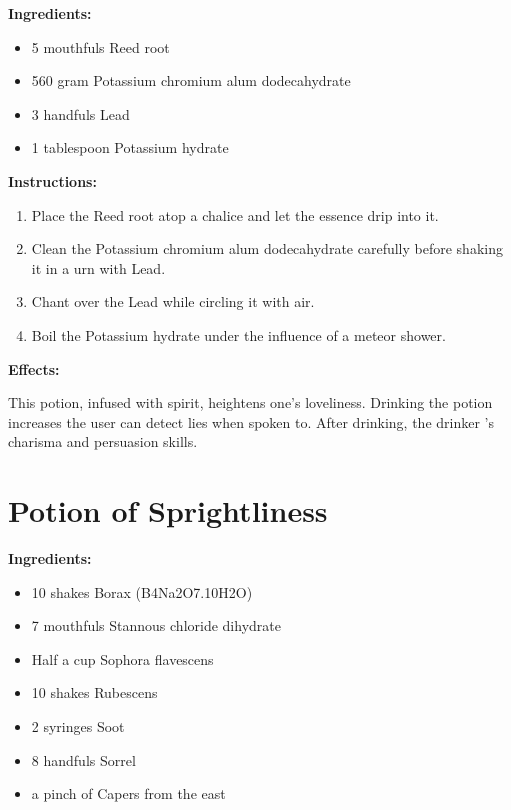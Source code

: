 \documentclass{article}
\begin{document}
\textbf{Ingredients:}

\begin{itemize}
  \item 5 mouthfuls Reed root
  \item 560 gram Potassium chromium alum dodecahydrate
  \item 3 handfuls Lead
  \item 1 tablespoon Potassium hydrate
\end{itemize}

\textbf{Instructions:}

\begin{enumerate}
  \item Place the Reed root atop a chalice and let the essence drip into it.
  \item Clean the Potassium chromium alum dodecahydrate carefully before shaking it in a urn with Lead.
  \item Chant over the Lead while circling it with air.
  \item Boil the Potassium hydrate under the influence of a meteor shower.
\end{enumerate}

\textbf{Effects:}

This potion, infused with spirit, heightens one's loveliness. Drinking the potion increases the user can detect lies when spoken to. After drinking, the drinker 's charisma and persuasion skills.

\newpage
\section*{Potion of Sprightliness}

\textbf{Ingredients:}

\begin{itemize}
  \item 10 shakes Borax (B4Na2O7.10H2O)
  \item 7 mouthfuls Stannous chloride dihydrate
  \item Half a cup Sophora flavescens
  \item 10 shakes Rubescens
  \item 2 syringes Soot
  \item 8 handfuls Sorrel
  \item a pinch of Capers from the east
\end{itemize}
\end{document}

